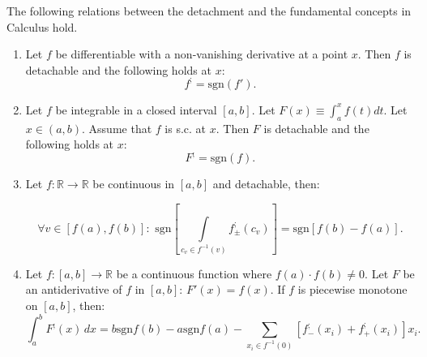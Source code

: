 \documentclass[11pt]{book}
\begin{document}
\begin{theorem}The following relations between the detachment and the fundamental concepts in Calculus hold.

\begin{enumerate}

\item Let $f$ be differentiable with a non-vanishing derivative at a point $x$. Then $f$ is detachable and the following holds at $x$:
$$f^{;}= \text{sgn}\left(f'\right).$$
\item Let $f$ be integrable in a closed interval $\left[a,b\right]$. Let $F\left(x\right)\equiv \int_a^x f\left(t\right)dt$. Let $x\in\left(a,b\right)$. Assume that $f$ is s.c. at $x.$ Then $F$ is detachable and the following holds at $x$:
$$F^{;}= \text{sgn}\left(f\right).$$

\item Let $f:\mathbb{R}\rightarrow\mathbb{R}$ be continuous in $\left[a,b\right]$ and detachable, then:

$$\forall v\in\left[f\left(a\right),f\left(b\right)\right]:\,\,\text{sgn}\left[\underset{c_{v}\in f^{-1}\left(v\right)}{\int}f_{\pm}^{;}\left(c_{v}\right)\right]=\text{sgn}\left[f\left(b\right)-f\left(a\right)\right].$$

\item Let $f:\left[a,b\right]\rightarrow\mathbb{R}$ be a continuous function where $f(a)\cdot f(b)\neq 0$. Let $F$ be an antiderivative of $f$ in $\left[a,b\right]$: $F'(x)=f(x)$. If $f$ is piecewise monotone on $\left[a,b\right]$, then:
$$\int_{a}^{b}F^{;}(x)\,dx=b\text{sgn}f\left(b\right)-a\text{sgn}f\left(a\right)-\underset{x_{i}\in f^{-1}\left(0\right)}{\sum}\left[f_{-}^{;}\left(x_{i}\right)+f_{+}^{;}\left(x_{i}\right)\right]x_{i}.$$
\end{enumerate}
\label{semi_discrete_fundamental}
\end{theorem}
\end{document}
